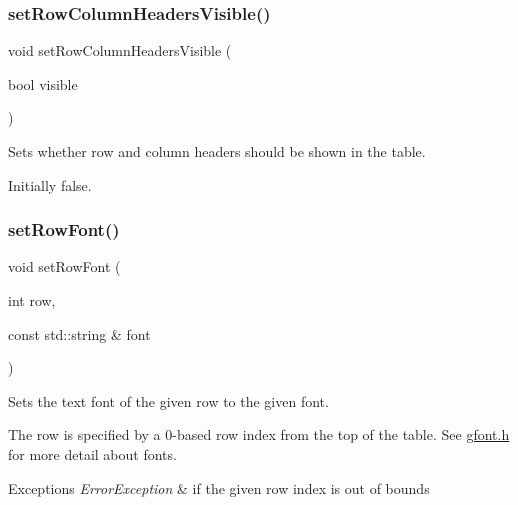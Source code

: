 \subsubsection{\texorpdfstring{set\+Row\+Column\+Headers\+Visible()}{setRowColumnHeadersVisible()}}
{\footnotesize\ttfamily void set\+Row\+Column\+Headers\+Visible (\begin{DoxyParamCaption}\item[{bool}]{visible }\end{DoxyParamCaption})\hspace{0.3cm}{\ttfamily [virtual]}}



Sets whether row and column headers should be shown in the table. 

Initially false. \mbox{\label{classsgl_1_1GTable_adaeccb3f3fd318185b8adc644aaca949}} 
\subsubsection{\texorpdfstring{set\+Row\+Font()}{setRowFont()}}
{\footnotesize\ttfamily void set\+Row\+Font (\begin{DoxyParamCaption}\item[{int}]{row,  }\item[{const std\+::string \&}]{font }\end{DoxyParamCaption})\hspace{0.3cm}{\ttfamily [virtual]}}



Sets the text font of the given row to the given font. 

The row is specified by a 0-\/based row index from the top of the table. See \mbox{\hyperlink{gfont_8h_source}{gfont.\+h}} for more detail about fonts. 
\begin{DoxyExceptions}{Exceptions}
{\em Error\+Exception} & if the given row index is out of bounds \\
\hline
\end{DoxyExceptions}
\mbox{\label{classsgl_1_1GTable_abe6e1382d3d98a9479cf43ac204b0ee3}} 
